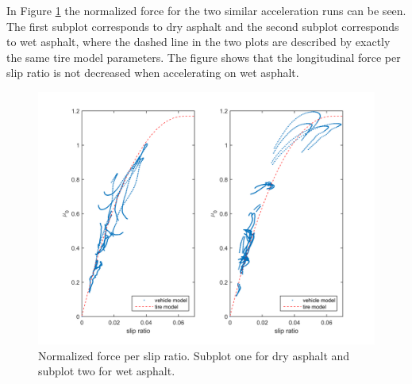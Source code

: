 In Figure \ref{slip_kraft_blot_och_torr} the normalized force for the two similar acceleration runs can be seen. The first subplot corresponds to dry asphalt and the second subplot corresponds to wet asphalt, where the dashed line in the two plots are described by exactly the same tire model parameters. The figure shows that the longitudinal force per slip ratio is not decreased when accelerating on wet asphalt. 

\begin{figure}[h]
	\centering
	\includegraphics[width=1.0\textwidth]{Pictures/slip_kraft_blot_och_torr}
	\caption {Normalized force per slip ratio. Subplot one for dry asphalt and subplot two for wet asphalt.}
	\label{slip_kraft_blot_och_torr}
\end{figure}
